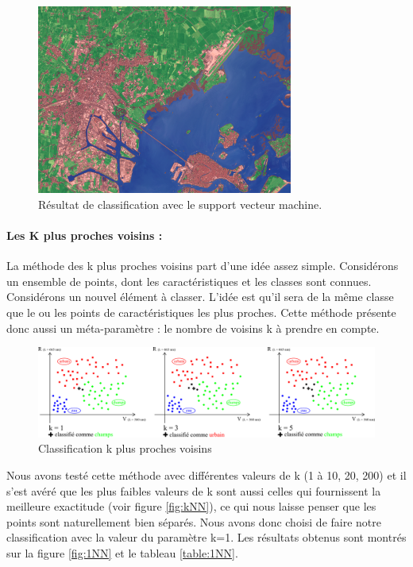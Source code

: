 \documentclass[a4paper,10pt]{article}
\begin{document}
\begin{figure}[H]
  \centering
    \includegraphics[width=0.75\textwidth]{veniseSVM}
  \caption{Résultat de classification avec le support vecteur machine.}
  \label{fig:veniseSVM}
\end{figure}


\paragraph{Les K plus proches voisins :}

La méthode des k plus proches voisins part d'une idée assez simple. Considérons un ensemble de points, dont les caractéristiques et les classes sont connues. Considérons un nouvel élément à classer. L'idée est qu'il sera de la même classe que le ou les points de caractéristiques les plus proches. Cette méthode présente donc aussi un méta-paramètre : le nombre de voisins k à prendre en compte. 

\begin{figure}[H]
  \centering
    \includegraphics[width=1.1\textwidth]{ml_knn}
  \caption{Classification k plus proches voisins}
  \label{fig:ml_knn}
\end{figure}

Nous avons testé cette méthode avec différentes valeurs de k (1 à 10, 20, 200) et il s'est avéré que les plus faibles valeurs de k sont aussi celles qui fournissent la meilleure exactitude (voir figure \ref{fig:kNN}), ce qui nous laisse penser que les points sont naturellement bien séparés. Nous avons donc choisi de faire notre classification avec la valeur du paramètre k=1. Les résultats obtenus sont montrés sur la figure \ref{fig:1NN} et le tableau \ref{table:1NN}.
\end{document}
